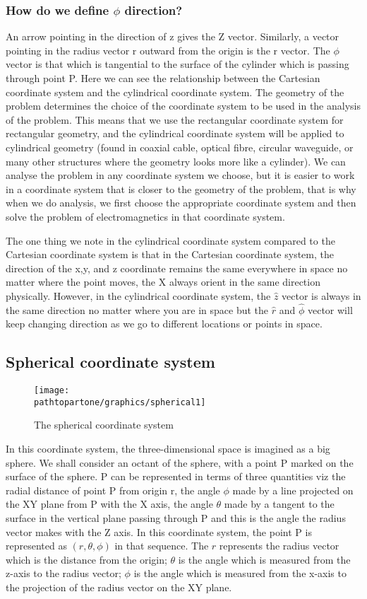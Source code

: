 \subsubsection*{ How do we define $\phi$ direction?} 
An arrow pointing in the direction of z gives the Z vector. Similarly, a vector pointing in the radius vector r outward from the origin is the r vector. The $\phi$ vector is that which is tangential to the surface of the cylinder which is passing through point P. Here we can see the relationship between the Cartesian coordinate system and the cylindrical coordinate system. The geometry of the problem determines the choice of the coordinate system to be used in the analysis of the problem. This means that we use the rectangular coordinate system for rectangular geometry, and the cylindrical coordinate system will be applied to cylindrical geometry (found in coaxial cable, optical fibre, circular waveguide, or many other structures where the geometry looks more like a cylinder).  We can analyse the problem in any coordinate system we choose, but it is easier to work in a coordinate system that is closer to the geometry of the problem, that is why when we do analysis, we first choose the appropriate coordinate system and then solve the problem of electromagnetics in that coordinate system.

The one thing we note in the cylindrical coordinate system compared to the Cartesian coordinate system is that in the Cartesian coordinate system, the direction of the x,y, and z coordinate remains the same everywhere in space no matter where the point moves, the X always orient in the same direction physically. However, in the cylindrical coordinate system, the $\hat{z}$ vector is always in the same direction no matter where you are in space but the $\hat{r}$ and $\hat{\phi}$ vector will keep changing direction as we go to different locations or points in space.

\subsection{Spherical coordinate system}
\begin{figure}[h]
\centering
\texttt{[image: \\pathtopartone/graphics/spherical1]}
\caption{The spherical  coordinate system}
\end{figure}

In this coordinate system, the three-dimensional space is imagined as a big sphere. We shall consider an octant of the sphere, with a point P marked on the surface of the sphere. P can be represented in terms of three quantities viz the radial distance of point P from origin r, the angle $\phi$ made by a line projected on the XY plane from P with the X axis, the angle $\theta$ made by a tangent to the surface in the vertical plane passing through P and this is the angle the radius vector makes with the Z axis. In this coordinate system, the point P is represented as $(r,\theta, \phi)$ in that sequence. The $r$ represents the radius vector which is the distance from the origin; $\theta$ is the angle which is measured from the z-axis to the radius vector; $\phi$ is the angle which is measured from the x-axis to the projection of the radius vector on the XY plane.

